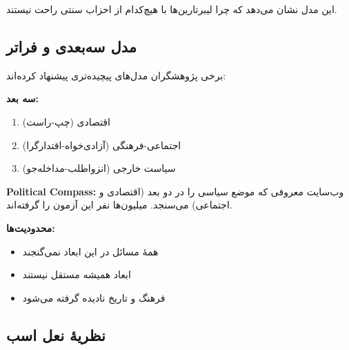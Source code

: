 این مدل نشان می‌دهد که چرا لیبرتارین‌ها با هیچ‌کدام از احزاب سنتی راحت نیستند.


\subsection{مدل سه‌بعدی و فراتر}


برخی پژوهشگران مدل‌های پیچیده‌تری پیشنهاد کرده‌اند:

\textbf{سه بعد:}
\begin{enumerate}
    \item اقتصادی (چپ-راست)
    \item اجتماعی-فرهنگی (آزادی‌خواه-اقتدارگرا)
    \item سیاست خارجی (انزواطلب-مداخله‌جو)
\end{enumerate}

\textbf{Political Compass:}
وب‌سایت معروفی که موضع سیاسی را در دو بعد (اقتصادی و اجتماعی) می‌سنجد. میلیون‌ها نفر این آزمون را گرفته‌اند.

\textbf{محدودیت‌ها:}
\begin{itemize}
    \item همهٔ مسائل در این ابعاد نمی‌گنجند
    \item ابعاد همیشه مستقل نیستند
    \item فرهنگ و تاریخ نادیده گرفته می‌شود
\end{itemize}


\subsection{نظریهٔ نعل اسب}

\begin{center}
\end{center}


